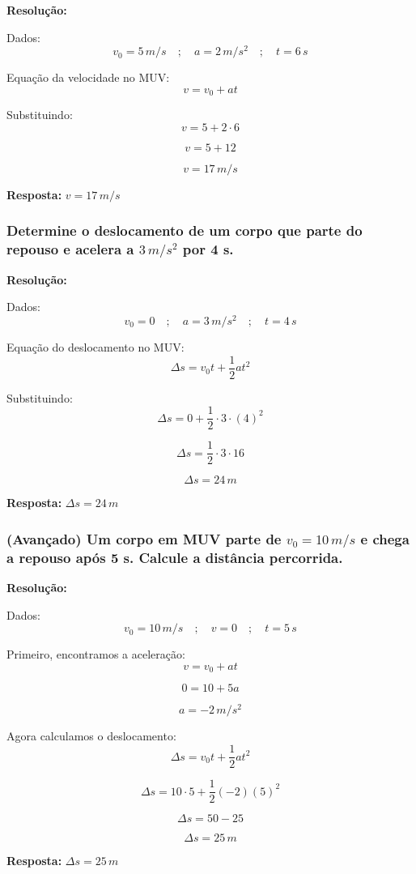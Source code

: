 \documentclass[a4paper,12pt]{article}
\begin{document}
{\color{blue}
\textbf{Resolução:}

Dados:
\[
v_0 = 5\,m/s \quad ; \quad a = 2\,m/s^2 \quad ; \quad t = 6\,s
\]

Equação da velocidade no MUV:
\[
v = v_0 + a t
\]

Substituindo:
\[
v = 5 + 2 \cdot 6
\]

\[
v = 5 + 12
\]

\[
v = 17\,m/s
\]

\textbf{Resposta:} $v = 17\,m/s$

}

\newpage

\subsubsection{Determine o deslocamento de um corpo que parte do repouso e acelera a $3\,m/s^2$ por 4 s.}

{\color{blue}
\textbf{Resolução:}

Dados:
\[
v_0 = 0 \quad ; \quad a = 3\,m/s^2 \quad ; \quad t = 4\,s
\]

Equação do deslocamento no MUV:
\[
\Delta s = v_0 t + \frac{1}{2} a t^2
\]

Substituindo:
\[
\Delta s = 0 + \frac{1}{2} \cdot 3 \cdot (4)^2
\]

\[
\Delta s = \frac{1}{2} \cdot 3 \cdot 16
\]

\[
\Delta s = 24\,m
\]

\textbf{Resposta:} $\Delta s = 24\,m$
}

\newpage

\subsubsection{(Avançado) Um corpo em MUV parte de $v_0 = 10\,m/s$ e chega a repouso após 5 s. Calcule a distância percorrida.}

{\color{blue}
\textbf{Resolução:}

Dados:
\[
v_0 = 10\,m/s \quad ; \quad v = 0 \quad ; \quad t = 5\,s
\]

Primeiro, encontramos a aceleração:
\[
v = v_0 + a t
\]

\[
0 = 10 + 5a
\]

\[
a = -2\,m/s^2
\]

Agora calculamos o deslocamento:
\[
\Delta s = v_0 t + \frac{1}{2} a t^2
\]

\[
\Delta s = 10 \cdot 5 + \frac{1}{2}(-2)(5)^2
\]

\[
\Delta s = 50 - 25
\]

\[
\Delta s = 25\,m
\]

\textbf{Resposta:} $\Delta s = 25\,m$

}
\end{document}
